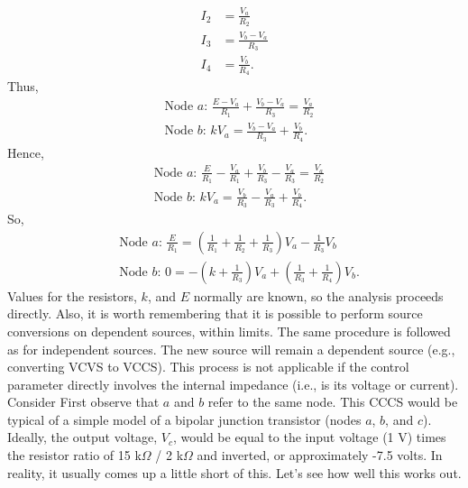 \documentclass{report}
\begin{document}
\begin{itemize}
\begin{align*}
                I_{2} &= \frac{V_{a}}{R_{2}} \\
                I_{3} &= \frac{V_{b} - V_{a}}{R_{3}} \\
                I_{4} &= \frac{V_{b}}{R_{4}}
            .\end{align*}
            Thus,
            \begin{align*}
                &\text{Node $a$: } \frac{E - V_{a}}{R_{1}} + \frac{V_{b}-V_{a}}{R_{3}} = \frac{V_{a}}{R_{2}} \\
                &\text{Node $b$: } kV_{a} = \frac{V_{b} - V_{a}}{R_{3}} + \frac{V_{b}}{R_{4}}
            .\end{align*}
            Hence,
            \begin{align*}
                &\text{Node $a$: } \frac{E}{R_{1}} - \frac{V_{a}}{R_{1}} + \frac{V_{b}}{R_{3}} - \frac{V_{a}}{R_{3}} = \frac{V_{a}}{R_{2}} \\
                &\text{Node $b$: } kV_{a} = \frac{V_{b}}{R_{3}} - \frac{V_{a}}{R_{3}} + \frac{V_{b}}{R_{4}}
            .\end{align*}
            So,
            \begin{align*}
                &\text{Node $a$: } \frac{E}{R_{1}} = \left(\frac{1}{R_{1}} + \frac{1}{R_{2}} + \frac{1}{R_{3}}\right)V_{a} - \frac{1}{R_{3}}V_{b} \\
                &\text{Node $b$: } 0 = -\left(k + \frac{1}{R_{3}}\right)V_{a} + \left(\frac{1}{R_{3}} + \frac{1}{R_{4}}\right)V_{b}
            .\end{align*}
            Values for the resistors, $k$, and $E$ normally are known, so the analysis proceeds directly.
            \bigbreak \noindent 
            Also, it is worth remembering that it is possible to perform source conversions on dependent sources, within limits. The same procedure is followed as for independent sources. The new source will remain a dependent source (e.g., converting VCVS to VCCS). This process is not applicable if the control parameter directly involves the internal impedance (i.e., is its voltage or current).
            \bigbreak \noindent 
            Consider
            \bigbreak \noindent 
            \bigbreak \noindent 
            First observe that $a$ and $b$ refer to the same node. This CCCS would be typical of a simple model of a bipolar junction transistor (nodes $a$, $b$, and $c$). Ideally, the output voltage, $V_{c}$, would be equal to the input voltage (1 V) times the resistor ratio of 15 k$\Omega$ / 2 k$\Omega$ and inverted, or approximately -7.5 volts. In reality, it usually comes up a little short of this. Let's see how well this works out.

\end{itemize}
\end{document}
